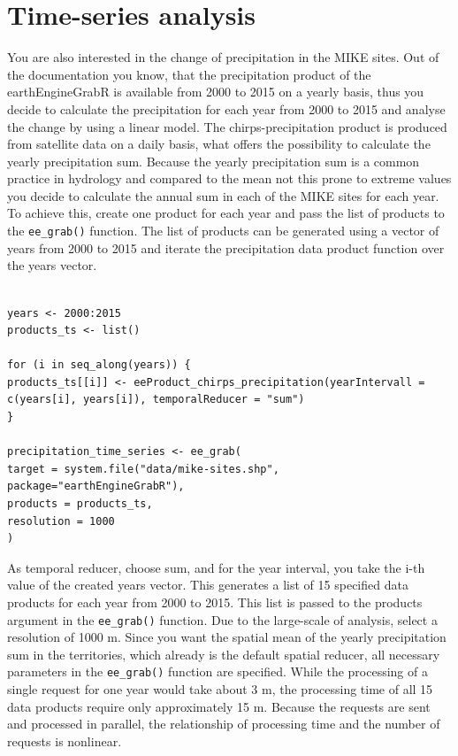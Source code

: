 \section{Time-series analysis}

You are also interested in the change of precipitation in the MIKE sites. Out of the documentation you know, that the precipitation product of the earthEngineGrabR is available from 2000 to 2015 on a yearly basis, thus you decide to calculate the precipitation for each year from 2000 to 2015 and analyse the change by using a linear model. The chirps-precipitation product is produced from satellite data on a daily basis, what offers the possibility to calculate the yearly precipitation sum. Because the yearly precipitation sum is a common practice in hydrology and compared to the mean not this prone to extreme values you decide to calculate the annual sum in each of the MIKE sites for each year. To achieve this, create one product for each year and pass the list of products to the \texttt{ee\_grab()} function.
The list of products can be generated using a vector of years from 2000 to 2015 and iterate the precipitation data product function over the years vector.

\begin{lstlisting}

years <- 2000:2015
products_ts <- list()

for (i in seq_along(years)) {
products_ts[[i]] <- eeProduct_chirps_precipitation(yearIntervall = c(years[i], years[i]), temporalReducer = "sum")
}

precipitation_time_series <- ee_grab(
target = system.file("data/mike-sites.shp", package="earthEngineGrabR"),
products = products_ts,
resolution = 1000
)
\end{lstlisting}


As temporal reducer, choose sum, and for the year interval, you take the i-th value of the created years vector. This generates a list of 15 specified data products for each year from 2000 to 2015. This list is passed to the products argument in the \texttt{ee\_grab()} function.
Due to the large-scale of analysis, select a resolution of 1000 m. Since you want the spatial mean of the yearly precipitation sum in the territories, which already is the default spatial reducer, all necessary parameters in the \texttt{ee\_grab()} function are specified. While the processing of a single request for one year would take about 3 m, the processing time of all 15 data products require only approximately 15 m. Because the requests are sent and processed in parallel, the relationship of processing time and the number of requests is nonlinear. 

